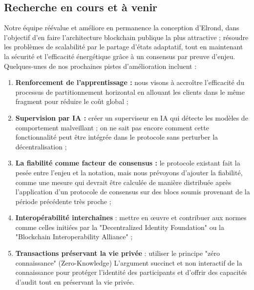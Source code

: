 \documentclass[journal]{IEEEtran}
\begin{document}
\subsection{Recherche en cours et à venir}
Notre équipe réévalue et améliore en permanence la conception d'Elrond, dans l'objectif d'en faire l'architecture blockchain publique la plus attractive ; résoudre les problèmes de scalabilité par le partage d'états adaptatif, tout en maintenant la sécurité et l'efficacité énergétique grâce à un consensus par preuve d'enjeu. Quelques-unes de nos prochaines pistes d'amélioration incluent :
\begin{enumerate}
  \item  \textbf{Renforcement de l'apprentissage :} nous visons à accroître l'efficacité du processus de partitionnement horizontal en allouant les clients dans le même fragment pour réduire  le coût global ;
  \item  \textbf{Supervision par IA :} créer un superviseur en IA qui détecte les modèles de comportement malveillant ; on ne sait pas encore comment cette fonctionnalité peut être intégrée dans le protocole sans perturber la décentralisation ;
  \item   \textbf{La fiabilité comme facteur de consensus : }le protocole existant fait la pesée entre l'enjeu et la notation, mais nous prévoyons d'ajouter la fiabilité, comme une mesure qui devrait être calculée de manière distribuée après l'application d'un protocole de consensus sur des blocs soumis provenant de la période précédente très proche ;
  \item   \textbf{Interopérabilité interchaînes} : mettre en œuvre et contribuer aux normes comme celles initiées par la  "Decentralized
Identity Foundation"  \cite{53} ou la "Blockchain Interoperability Alliance" \cite{54} ;
  \item  \textbf{Transactions préservant la vie privée} : utiliser le principe "zéro connaissance" (Zero-Knowledge) L'argument succinct et non interactif de la connaissance \cite{55} pour protéger l'identité des participants et d'offrir des capacités d'audit tout en préservant la vie privée.
\end{enumerate}
\end{document}
